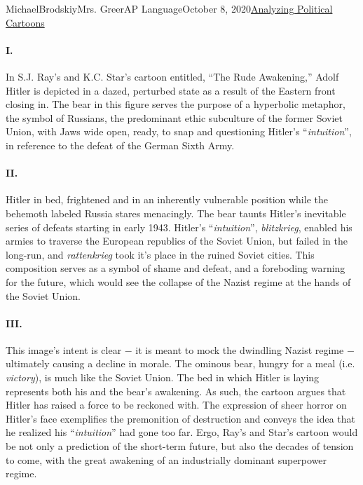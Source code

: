 \documentclass[12pt,letterpaper]{article}
\begin{document}
\begin{mla}{Michael}{Brodskiy}{Mrs. Greer}{AP Language}{October 8, 2020}{\underline{Analyzing Political Cartoons}} 

  \begin{justifying}

    \paragraph{I.} In S.J. Ray's and K.C. Star's cartoon entitled, ``The Rude Awakening,'' Adolf Hitler is depicted in a dazed, perturbed state as a result of the Eastern front closing in. The bear in this figure serves the purpose of a hyperbolic metaphor, the symbol of Russians, the predominant ethic subculture of the former Soviet Union, with Jaws wide open, ready, to snap and questioning Hitler's ``\emph{intuition}'', in reference to the defeat of the German Sixth Army.%
    \paragraph{II.} Hitler in bed, frightened and in an inherently vulnerable position while the behemoth labeled Russia stares menacingly. The bear taunts Hitler's inevitable series of defeats starting in early 1943. Hitler's ``\emph{intuition}'', \textit{blitzkrieg}, enabled his armies to traverse the European republics of the Soviet Union, but failed in the long-run, and \textit{rattenkrieg} took it's place in the ruined Soviet cities. This composition serves as a symbol of shame and defeat, and a foreboding warning for the future, which would see the collapse of the Nazist regime at the hands of the Soviet Union.
    \paragraph{III.} This image's intent is clear $-$ it is meant to mock the dwindling Nazist regime $-$ ultimately causing a decline in morale. The ominous bear, hungry for a meal (i.e. \emph{victory}), is much like the Soviet Union. The bed in which Hitler is laying represents both his and the bear's awakening. As such, the cartoon argues that Hitler has raised a force to be reckoned with. The expression of sheer horror on Hitler's face exemplifies the premonition of destruction and conveys the idea that he realized his ``\emph{intuition}'' had gone too far. Ergo, Ray's and Star's cartoon would be not only a prediction of the short-term future, but also the decades of tension to come, with the great awakening of an industrially dominant superpower regime.



\end{justifying}
\end{mla}
\end{document}
